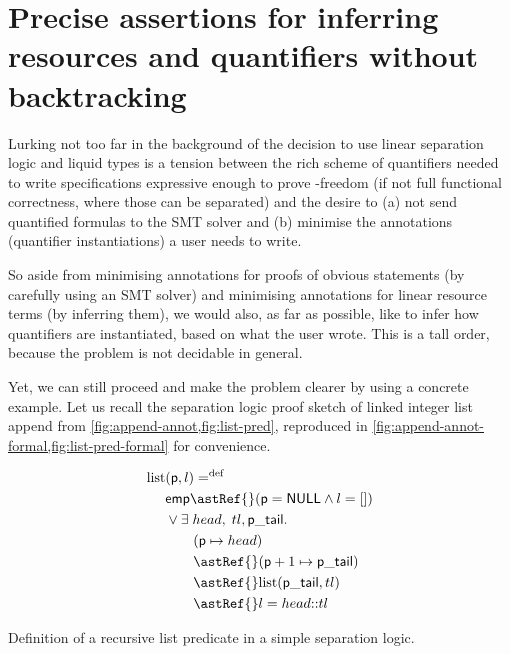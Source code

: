 \section{Precise assertions for inferring resources and quantifiers without
backtracking}\label{sec:precise-assertion-inferring}

Lurking not too far in the background of the decision to use linear separation
logic and liquid types is a tension between the rich scheme of quantifiers
needed to write specifications expressive enough to prove -freedom (if
not full functional correctness, where those can be separated) and the desire
to (a) not send quantified formulas to the SMT solver and (b) minimise the
annotations (quantifier instantiations) a user needs to write.

So aside from minimising annotations for proofs of obvious statements (by
carefully using an SMT solver) and minimising annotations for linear resource
terms (by inferring them), we would also, as far as possible, like to
infer how quantifiers are instantiated, based on what the user wrote. This is a tall order,
because the problem is not decidable in
general.

Yet, we can still proceed and make the problem clearer by using a concrete
example. Let us recall the separation logic proof sketch of linked integer list
append from \cref{fig:append-annot,fig:list-pred}, reproduced in
\cref{fig:append-annot-formal,fig:list-pred-formal} for convenience.

\begin{marginfigure}
    \centering
    \begin{align*}
        \mathrm{list} &(\mathsf{p}, l) \mathrel{{=}^\mathrm{def}} \\
                      &\mathsf{emp} \astRef{} (\mathsf{p} = \mathsf{NULL} \wedge{} l = []) \\
                      &\vee{} \exists{} \; {head}, \; {tl}, \mathsf{p\_tail}.\\
                      &\qquad (\mathsf{p} \mapsto{} {head}) \\
                      &\qquad \astRef{} (\mathsf{p} + 1 \mapsto{} \mathsf{p\_tail}) \\
                      &\qquad \astRef{} \mathrm{list} (\mathsf{p\_tail}, {tl}) \\
                      &\qquad \astRef{} l = {head} {:}{:} {tl} \\
    \end{align*}
    \caption{Definition of a recursive list predicate in a simple separation
        logic.}\label{fig:list-pred-formal}
\end{marginfigure}


